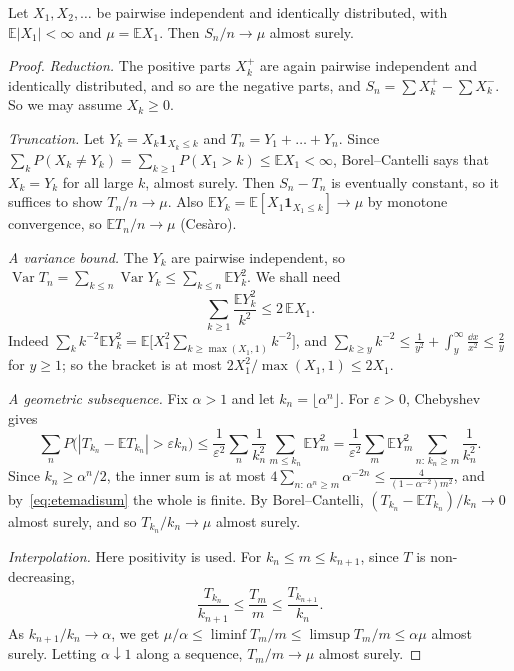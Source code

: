 \begin{theorem}[Etemadi, 1981]\label{thm:etemadi}
Let $X_1,X_2,\dots$ be pairwise independent and identically distributed, with $\mathbb E|X_1|<\infty$ and $\mu=\mathbb E X_1$. Then
$S_n/n\to\mu$ almost surely.
\end{theorem}
\begin{proof}
\emph{Reduction.} The positive parts $X_k^+$ are again pairwise independent and identically distributed, and so are the negative parts, and
$S_n=\sum X_k^+-\sum X_k^-$. So we may assume $X_k\ge0$.

\emph{Truncation.} Let $Y_k=X_k\mathbf 1_{X_k\le k}$ and $T_n=Y_1+\dots+Y_n$. Since $\sum_kP(X_k\ne Y_k)=\sum_{k\ge1}P(X_1>k)\le\mathbb E X_1<\infty$,
Borel--Cantelli says that $X_k=Y_k$ for all large $k$, almost surely. Then $S_n-T_n$ is eventually constant, so it suffices to show
$T_n/n\to\mu$. Also $\mathbb E Y_k=\mathbb E[X_1\mathbf 1_{X_1\le k}]\to\mu$ by monotone convergence, so $\mathbb E T_n/n\to\mu$ (Ces\`aro).

\emph{A variance bound.} The $Y_k$ are pairwise independent, so $\operatorname{Var}T_n=\sum_{k\le n}\operatorname{Var}Y_k\le\sum_{k\le n}\mathbb E Y_k^2$.
We shall need
\begin{equation}\label{eq:etemadisum}
\sum_{k\ge1}\frac{\mathbb E Y_k^2}{k^2}\le2\,\mathbb E X_1.
\end{equation}
Indeed $\sum_kk^{-2}\mathbb E Y_k^2=\mathbb E\bigl[X_1^2\sum_{k\ge\max(X_1,1)}k^{-2}\bigr]$, and $\sum_{k\ge y}k^{-2}\le\frac1{y^2}+\int_y^\infty
\frac{\dd x}{x^2}\le\frac2y$ for $y\ge1$; so the bracket is at most $2X_1^2/\max(X_1,1)\le2X_1$.

\emph{A geometric subsequence.} Fix $\alpha>1$ and let $k_n=\lfloor\alpha^n\rfloor$. For $\varepsilon>0$, Chebyshev gives
\[
\sum_nP\bigl(|T_{k_n}-\mathbb E T_{k_n}|>\varepsilon k_n\bigr)\le\frac1{\varepsilon^2}\sum_n\frac1{k_n^2}\sum_{m\le k_n}\mathbb E Y_m^2=
\frac1{\varepsilon^2}\sum_m\mathbb E Y_m^2\sum_{n:\,k_n\ge m}\frac1{k_n^2}.
\]
Since $k_n\ge\alpha^n/2$, the inner sum is at most $4\sum_{n:\,\alpha^n\ge m}\alpha^{-2n}\le\frac{4}{(1-\alpha^{-2})m^2}$, and by~\eqref{eq:etemadisum}
the whole is finite. By Borel--Cantelli, $(T_{k_n}-\mathbb E T_{k_n})/k_n\to0$ almost surely, and so $T_{k_n}/k_n\to\mu$ almost surely.

\emph{Interpolation.} Here positivity is used. For $k_n\le m\le k_{n+1}$, since $T$ is non-decreasing,
\[
\frac{T_{k_n}}{k_{n+1}}\le\frac{T_m}m\le\frac{T_{k_{n+1}}}{k_n}.
\]
As $k_{n+1}/k_n\to\alpha$, we get $\mu/\alpha\le\liminf T_m/m\le\limsup T_m/m\le\alpha\mu$ almost surely. Letting $\alpha\downarrow1$ along a
sequence, $T_m/m\to\mu$ almost surely.
\end{proof}

